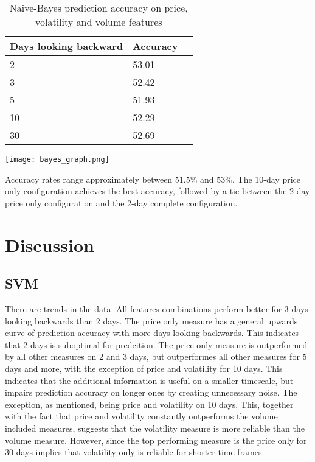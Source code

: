 \documentclass{article}
\begin{document}
\begin{table}[!h]
\begin{center}
    \begin{tabular}{ | l | l | p{3cm} |}
    \hline
    Days looking backward & Accuracy \\ \hline
    2 & 53.01  \\ \hline
    3 & 52.42  \\ \hline
    5 & 51.93  \\ \hline
    10 & 52.29  \\ \hline
    30 & 52.69 \\ 
    \hline
    \end{tabular}
\caption{Naive-Bayes prediction accuracy on price, volatility and volume features}
\end{center}
\end{table}

\texttt{[image: bayes\_graph.png]}

Accuracy rates range approximately between $51.5\%$ and $53\%$. The 10-day price only configuration achieves the best accuracy, followed by a tie between the 2-day price only configuration and the 2-day complete configuration.

\newpage

\section{Discussion}
\subsection{SVM}
There are trends in the data. All features combinations perform better for 3 days looking backwards than 2 days. The price only measure has a general upwards curve of prediction accuracy with more days looking backwards. This indicates that 2 days is suboptimal for predcition. The price only measure is outperformed by all other measures on 2 and 3 days, but outperformes all other measures for 5 days and more, with the exception of price and volatility for 10 days. This indicates that the additional information is useful on a smaller timescale, but impairs prediction accuracy on longer ones by creating unnecessary noise. The exception, as mentioned, being price and volatility on 10 days. This, together with the fact that price and volatility constantly outperforms the volume included measures, suggests that the volatility measure is more reliable than the volume measure. However, since the top performing measure is the price only for 30 days implies that volatility only is reliable for shorter time frames.
\end{document}

